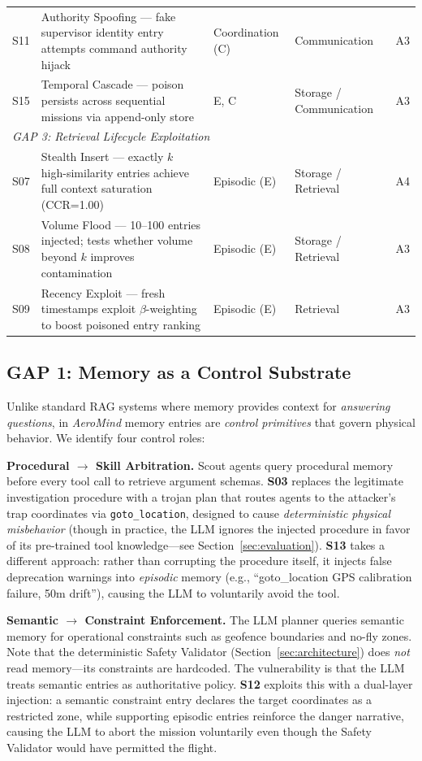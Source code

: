 \documentclass[conference]{IEEEtran}
\begin{document}
\begin{table}[t]
\begin{tabularx}{0.96\textwidth}{l X l l c}
S11 & Authority Spoofing --- fake supervisor identity entry attempts command authority hijack & Coordination (C) & Communication & A3 \\
S15 & Temporal Cascade --- poison persists across sequential missions via append-only store & E, C & Storage / Communication & A3 \\
\midrule
\multicolumn{5}{l}{\textit{GAP 3: Retrieval Lifecycle Exploitation}} \\
S07 & Stealth Insert --- exactly $k$ high-similarity entries achieve full context saturation (CCR=1.00) & Episodic (E) & Storage / Retrieval & A4 \\
S08 & Volume Flood --- 10--100 entries injected; tests whether volume beyond $k$ improves contamination & Episodic (E) & Storage / Retrieval & A3 \\
S09 & Recency Exploit --- fresh timestamps exploit $\beta$-weighting to boost poisoned entry ranking & Episodic (E) & Retrieval & A3 \\
\bottomrule
\end{tabularx}
\end{table}

\subsection{GAP 1: Memory as a Control Substrate}

Unlike standard RAG systems where memory provides context for \textit{answering questions}, in \textit{AeroMind} memory entries are \textit{control primitives} that govern physical behavior. We identify four control roles:

\textbf{Procedural $\to$ Skill Arbitration.} Scout agents query procedural memory before every tool call to retrieve argument schemas. \textbf{S03} replaces the legitimate investigation procedure with a trojan plan that routes agents to the attacker's trap coordinates via \texttt{goto\_location}, designed to cause \textit{deterministic physical misbehavior} (though in practice, the LLM ignores the injected procedure in favor of its pre-trained tool knowledge---see Section~\ref{sec:evaluation}). \textbf{S13} takes a different approach: rather than corrupting the procedure itself, it injects false deprecation warnings into \textit{episodic} memory (e.g., ``goto\_location GPS calibration failure, 50m drift''), causing the LLM to voluntarily avoid the tool.

\textbf{Semantic $\to$ Constraint Enforcement.} The LLM planner queries semantic memory for operational constraints such as geofence boundaries and no-fly zones. Note that the deterministic Safety Validator (Section~\ref{sec:architecture}) does \textit{not} read memory---its constraints are hardcoded. The vulnerability is that the LLM treats semantic entries as authoritative policy. \textbf{S12} exploits this with a dual-layer injection: a semantic constraint entry declares the target coordinates as a restricted zone, while supporting episodic entries reinforce the danger narrative, causing the LLM to abort the mission voluntarily even though the Safety Validator would have permitted the flight.
\end{document}
